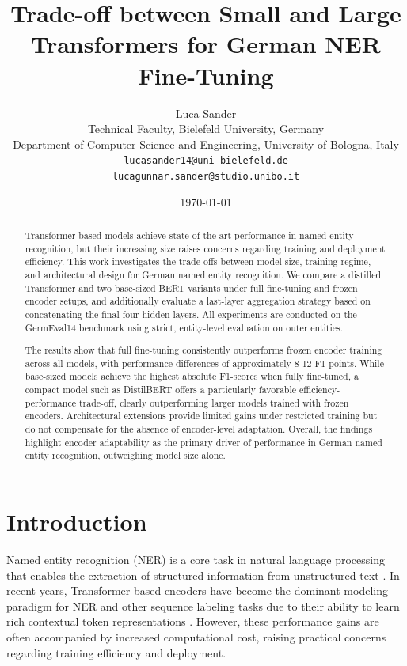 \documentclass[11pt,a4paper,twocolumn]{article}
\title{Trade-off between Small and Large Transformers for German NER Fine-Tuning}
\author{
Luca Sander\\
\small
Technical Faculty, Bielefeld University, Germany\\
\small
Department of Computer Science and Engineering, University of Bologna, Italy\\
\small
\texttt{lucasander14@uni-bielefeld.de}\\
\small
\texttt{lucagunnar.sander@studio.unibo.it}
}
\date{\today}
\begin{document}
\maketitle
\begin{abstract}
Transformer-based models achieve state-of-the-art performance in named entity recognition, but their increasing size raises concerns regarding training and deployment efficiency.
This work investigates the trade-offs between model size, training regime, and architectural design for German named entity recognition.
We compare a distilled Transformer and two base-sized BERT variants under full fine-tuning and frozen encoder setups, and additionally evaluate a last-layer aggregation strategy based on concatenating the final four hidden layers.
All experiments are conducted on the GermEval14 benchmark using strict, entity-level evaluation on outer entities.

The results show that full fine-tuning consistently outperforms frozen encoder training across all models, with performance differences of approximately 8-12 F1 points.
While base-sized models achieve the highest absolute F1-scores when fully fine-tuned, a compact model such as DistilBERT offers a particularly favorable efficiency-performance trade-off, clearly outperforming larger models trained with frozen encoders.
Architectural extensions provide limited gains under restricted training but do not compensate for the absence of encoder-level adaptation.
Overall, the findings highlight encoder adaptability as the primary driver of performance in German named entity recognition, outweighing model size alone.
\end{abstract}


\section{Introduction}

Named entity recognition (NER) is a core task in natural language processing that enables the extraction of structured information from unstructured text \cite{tjong_kim_sang_introduction_2003}.
In recent years, Transformer-based encoders have become the dominant modeling paradigm for NER and other sequence labeling tasks due to their ability to learn rich contextual token representations \cite{vaswani_attention_2017}.
However, these performance gains are often accompanied by increased computational cost, raising practical concerns regarding training efficiency and deployment.
\end{document}
